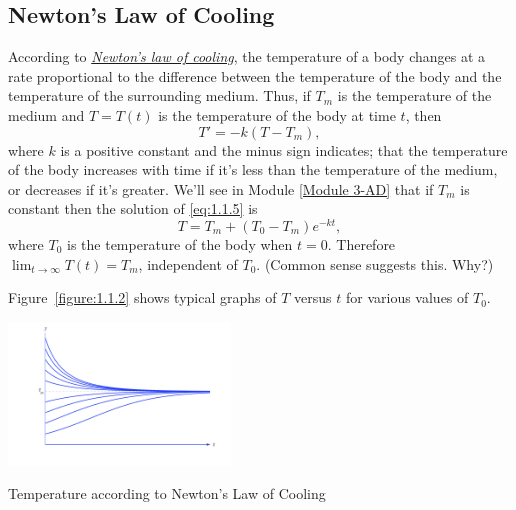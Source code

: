 \documentclass{ximera}
\begin{document}
 



\subsection*{Newton's Law of Cooling}
\noindent
According to
\href{http://www-history.mcs.st-and.ac.uk/Mathematicians/Newton.html}
{\color{blue}\it Newton's
law of cooling},  the temperature of a
body changes at a rate proportional to the difference between the
temperature of the body and the temperature of the surrounding medium.
 Thus, if  $T_m$ is the temperature of the
medium and
$T=T(t)$ is the temperature of the body at time $t$, then
\begin{equation} \label{eq:1.1.5}
T' = -k(T-T_m),
\end{equation}
where $k$ is a positive constant and the  minus sign indicates;   that
the temperature of the body increases with time if it's less than the
temperature of the medium, or decreases if it's  greater. We'll see
in Module \ref{Module 3-AD} that if
$T_m$ is constant then the solution of \eqref{eq:1.1.5} is
\begin{equation} \label{eq:1.1.6}
T=T_m+(T_0-T_m)e^{-kt},
\end{equation}
where $T_0$ is the temperature of the body when $t=0$.
Therefore $\lim_{t\to\infty}T(t)=T_m$, independent of $T_0$.
(Common sense suggests this. Why?)

Figure~\ref{figure:1.1.2} shows typical graphs of $T$ versus $t$ for
various values of  $T_0$.

\begin{image}
  \includegraphics[height=1.5in]{fig010102.jpg}
\end{image}
{\centering
\color{blue}
 \caption{Temperature according to Newton's Law of Cooling}

 }
\end{document}
